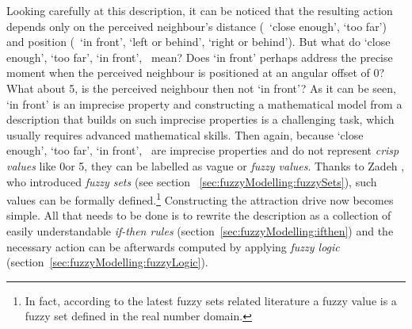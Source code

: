 Looking carefully at this description, it can be noticed that the resulting action depends only on the perceived neighbour's distance (\ie\ `close enough', `too far') and position (\ie\ `in front', `left or behind', `right or behind'). But what do `close enough', `too far', `in front', \etc\ mean? Does `in front' perhaps address the precise moment when the perceived neighbour is positioned at an angular offset of 0\deg? What about 5\deg, is the perceived neighbour then not `in front'? As it can be seen, `in front' is an imprecise property and constructing a mathematical model from a description that builds on such imprecise properties is a challenging task, which usually requires advanced mathematical skills. Then again, because `close enough', `too far', `in front', \etc\ are imprecise properties and do not represent \emph{crisp values} like 0\deg or 5\deg, they can be labelled as vague or \emph{fuzzy values}. Thanks to Zadeh \cite{zadeh:1965}, who introduced \emph{fuzzy sets} (see section ~\ref{sec:fuzzyModelling:fuzzySets}), such values can be formally defined.\footnote{In fact, according to the latest fuzzy sets related literature \cite{lee:2004} a fuzzy value is a fuzzy set defined in the real number domain.} Constructing the attraction drive now becomes simple. All that needs to be done is to rewrite the description as a collection of easily understandable \emph{if-then rules} (section~\ref{sec:fuzzyModelling:ifthen}) and the necessary action can be afterwards computed by applying \emph{fuzzy logic} (section~\ref{sec:fuzzyModelling:fuzzyLogic}).

